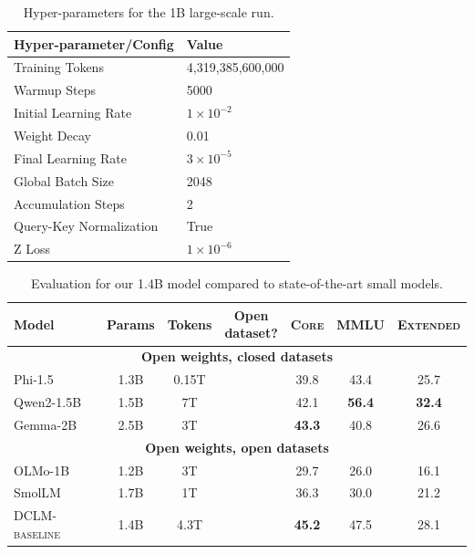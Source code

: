 \documentclass{article}
\newcommand{\cmark}{\ding{51}}%
\newcommand{\xmark}{\ding{55}}%
\newcommand{\hqpool}{\textsc{DCLM-baseline}\xspace}
\newcommand{\lowvar}{\textsc{Core}\xspace}
\newcommand{\aggscore}{\textsc{Extended}\xspace}
\begin{document}
\begin{table}[t]
    \centering
    \caption{Hyper-parameters for the 1B large-scale run.}
    \begin{tabular}{ll}
        \toprule
        Hyper-parameter/Config & Value \\
        \midrule
        Training Tokens &  4,319,385,600,000  \\
        Warmup Steps & 5000 \\
        Initial Learning Rate & $1\times 10^{-2}$ \\
        Weight Decay & 0.01 \\
        Final Learning Rate  & $3 \times 10^{-5}$ \\
        Global Batch Size & 2048 \\
        Accumulation Steps & 2 \\
        Query-Key Normalization & True \\
        Z Loss & $1 \times 10^{-6}$ \\
        \bottomrule
    \end{tabular}

    \label{tab:hyperparameters-1b}
\end{table}

\begin{table}[t]
\centering
\caption{Evaluation for our 1.4B model compared to state-of-the-art small models.}
\begin{tabular}{lcccccc}
\toprule
Model & Params & Tokens & \makecell{Open \\ dataset?} & \lowvar & MMLU & \aggscore \\
\midrule
\multicolumn{7}{c}{\textbf{Open weights, closed datasets}} \\\midrule
Phi-1.5 & 1.3B & 0.15T & \xmark & 39.8 & 43.4 & 25.7 \\
Qwen2-1.5B & 1.5B & 7T & \xmark & 42.1 & \textbf{56.4} & \textbf{32.4} \\
Gemma-2B & 2.5B & 3T & \xmark & \textbf{43.3} & 40.8 & 26.6 \\\midrule
\multicolumn{7}{c}{\textbf{Open weights, open datasets}} \\\midrule
%
%
OLMo-1B & 1.2B & 3T & \cmark & 29.7 & 26.0 & 16.1 \\
SmolLM & 1.7B & 1T & \cmark & 36.3 & 30.0 & 21.2 \\
\hqpool & 1.4B & 4.3T & \cmark & \textbf{45.2} & 47.5 & 28.1 \\\bottomrule
\end{tabular}
\label{tab:hero-1b-results}
\end{table}
\end{document}
